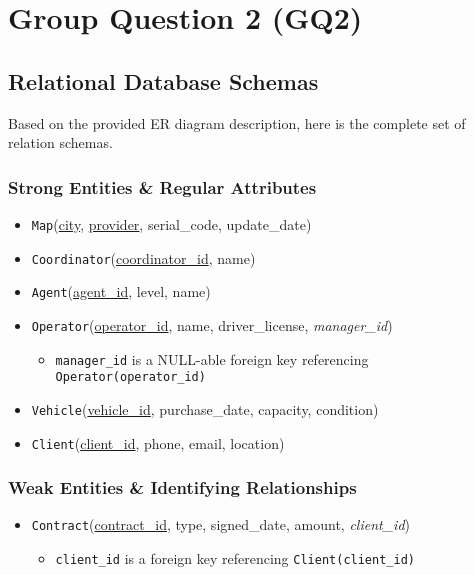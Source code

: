 \documentclass[12pt]{article}
\begin{document}
\newpage
\section{Group Question 2 (GQ2)}
\subsection{Relational Database Schemas}

Based on the provided ER diagram description, here is the complete set of relation schemas.

\subsubsection{Strong Entities \& Regular Attributes}
\begin{itemize}
    \item \texttt{Map}(\underline{city}, \underline{provider}, serial\_code, update\_date)
    \item \texttt{Coordinator}(\underline{coordinator\_id}, name)
    \item \texttt{Agent}(\underline{agent\_id}, level, name)
    \item \texttt{Operator}(\underline{operator\_id}, name, driver\_license, \textit{manager\_id})
    \begin{itemize}
        \item \texttt{manager\_id} is a NULL-able foreign key referencing \texttt{Operator(operator\_id)}
    \end{itemize}
    \item \texttt{Vehicle}(\underline{vehicle\_id}, purchase\_date, capacity, condition)
    \item \texttt{Client}(\underline{client\_id}, phone, email, location)
\end{itemize}

\subsubsection{Weak Entities \& Identifying Relationships}
\begin{itemize}
    \item \texttt{Contract}(\underline{contract\_id}, type, signed\_date, amount, \textit{client\_id})
    \begin{itemize}
        \item \texttt{client\_id} is a foreign key referencing \texttt{Client(client\_id)}
    \end{itemize}
\end{itemize}
\end{document}

